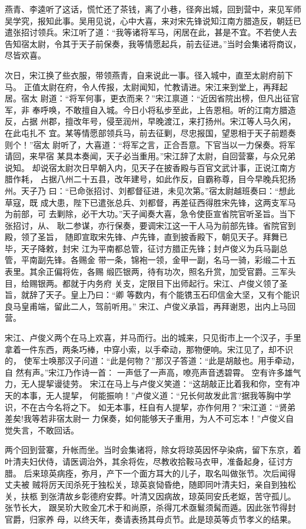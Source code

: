 燕青、李逵听了这话，慌忙还了茶钱，离了小巷，径奔出城，回到营中，来见军师
吴学究，报知此事。吴用见说，心中大喜，来对宋先锋说知江南方腊造反，朝廷已
遣张招讨领兵。宋江听了道：“我等诸将军马，闲居在此，甚是不宜。不若使人去
告知宿太尉，令其于天子前保奏，我等情愿起兵，前去征进。”当时会集诸将商议，
尽皆欢喜。

次日，宋江换了些衣服，带领燕青，自来说此一事。径入城中，直至太尉府前下马。
正值太尉在府，令人传报，太尉闻知，忙教请进。宋江来到堂上，再拜起居。宿太
尉道：“将军何事，更衣而来？”宋江禀道：“近因省院出榜，但凡出征官军，非
奉呼唤，不敢擅自入城。今日小将私步至此，上告恩相。听的江南方腊造反，占据
州郡，擅改年号，侵至润州，早晚渡江，来打扬州。宋江等人马久闲，在此屯扎不
宜。某等情愿部领兵马，前去征剿，尽忠报国，望恩相于天子前题奏则个！”宿太
尉听了，大喜道：“将军之言，正合吾意。下官当以一力保奏。将军请回，来早宿
某具本奏闻，天子必当重用。”宋江辞了太尉，自回营寨，与众兄弟说知。
却说宿太尉次日早朝入内，见天子在披香殿与百官文武计事，正说江南方腊作耗，
占据八州二十五县，改年建号，如此作反，自霸称尊，目今早晚兵犯扬州。天子乃
曰：“已命张招讨、刘都督征进，未见次第。”宿太尉越班奏曰：“想此草寇，既
成大患，陛下已遣张总兵、刘都督，再差征西得胜宋先锋，这两支军马为前部，可
去剿除，必干大功。”天子闻奏大喜，急令使臣宣省院官听圣旨。当下张招讨，从、
耿二参谋，亦行保奏，要调宋江这一干人马为前部先锋。省院官到殿，领了圣旨，
随即宣取宋先锋、卢先锋，直到披香殿下，朝见天子。拜舞已毕，天子降敕，封宋
江为平南都总管，征讨方腊正先锋；封卢俊义为兵马副总管，平南副先锋。各赐金
带一条，锦袍一领，金甲一副，名马一骑，彩缎二十五表里。其余正偏将佐，各赐
缎匹银两，待有功次，照名升赏，加受官爵。三军头目，给赐银两。都就于内务府
关支，定限目下出师起行。宋江、卢俊义领了圣旨，就辞了天子。皇上乃曰：“卿
等数内，有个能镌玉石印信金大坚，又有个能识良马皇甫端，留此二人，驾前听用。”
宋江、卢俊义承旨，再拜谢恩，出内上马回营。

宋江、卢俊义两个在马上欢喜，并马而行。出的城来，只见街市上一个汉子，手里
拿着一件东西，两条巧棒，中穿小索，以手牵动，那物便响。宋江见了，却不识的，
使军士唤那汉子问道：“此是何物？”那汉子答道：“此是胡敲也。用手牵动，自
然有声。”宋江乃作诗一首：
一声低了一声高，嘹亮声音透碧霄。
空有许多雄气力，无人提挈谩徒劳。
宋江在马上与卢俊义笑道：“这胡敲正比着我和你，空有冲天的本事，无人提挈，
何能振响！”卢俊义道：“兄长何故发此言?据我等胸中学识，不在古今名将之下。
如无本事，枉自有人提挈，亦作何用？”宋江道：“贤弟差矣!我等若非宿太尉一
力保奏，如何能够天子重用，为人不可忘本！”卢俊义自觉失言，不敢回话。

两个回到营寨，升帐而坐。当时会集诸将，除女将琼英因怀孕染病，留下东京，着
叶清夫妇伏侍，请医调治外，其余将佐，尽教收拾鞍马衣甲，准备起身，征讨方腊。
后来琼英病痊，弥月，产下一个面方耳大的儿子，取名叫做张节。次后闻得丈夫被
贼将厉天闰杀死于独松关，琼英哀恸昏绝，随即同叶清夫妇，亲自到独松关，扶柩
到张清故乡彰德府安葬。叶清又因病故，琼英同安氏老妪，苦守孤儿。张节长大，
跟吴玠大败金兀术于和尚原，杀得兀术亟鬄须髯而遁。因此张节得封官爵，归家养
母，以终天年，奏请表扬其母贞节。此是琼英等贞节孝义的结果。

